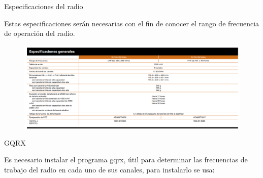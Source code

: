 \begin{frame}{Especificaciones del radio}

Estas especificaciones serán necesarias con el fin de conocer el rango de frecuencia de operación del radio.

\begin{figure}[H]
\centering
\vspace{-3mm}
\includegraphics[width=\textwidth]{parte3/lab10/pdf/lab10_2.pdf}
\end{figure}

\end{frame}

\begin{frame}{GQRX}

Es necesario instalar el programa gqrx, útil para determinar las frecuencias de trabajo del radio en cada uno de sus canales, para instalarlo se usa:


\end{frame}

